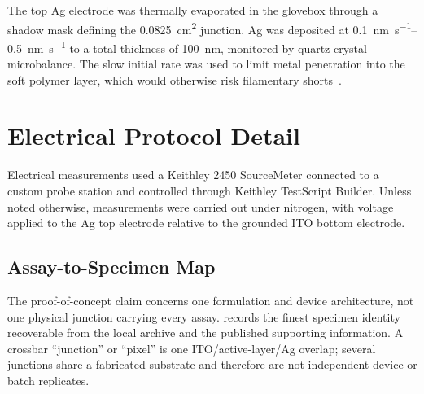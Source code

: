 The top Ag electrode was thermally evaporated in the glovebox through a shadow mask defining the \SI{0.0825}{\square\centi\metre} junction. Ag was deposited at \SIrange{0.1}{0.5}{\nano\metre\per\second} to a total thickness of \SI{100}{\nano\metre}, monitored by quartz crystal microbalance. The slow initial rate was used to limit metal penetration into the soft polymer layer, which would otherwise risk filamentary shorts~\cite{Hung1997}.

\section{Electrical Protocol Detail}\label{app:ch2_electrical_protocols}

Electrical measurements used a Keithley 2450 SourceMeter connected to a custom probe station and controlled through Keithley TestScript Builder. Unless noted otherwise, measurements were carried out under nitrogen, with voltage applied to the Ag top electrode relative to the grounded ITO bottom electrode.

\subsection{Assay-to-Specimen Map}\label{app:ch2_assay_specimens}

The proof-of-concept claim concerns one formulation and device architecture, not one physical junction carrying every assay.  records the finest specimen identity recoverable from the local archive and the published supporting information. A crossbar ``junction'' or ``pixel'' is one ITO/active-layer/Ag overlap; several junctions share a fabricated substrate and therefore are not independent device or batch replicates.

